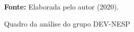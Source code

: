 \begin{figure}[ht!]
\centering

\caption{\textmd{Quadro da análise do grupo DEV-NESP}}
\label{fig:quadro:grupodevnesp}

\par\medskip\textbf{Fonte:} Elaborada pelo autor (2020). \par\medskip

\end{figure}

